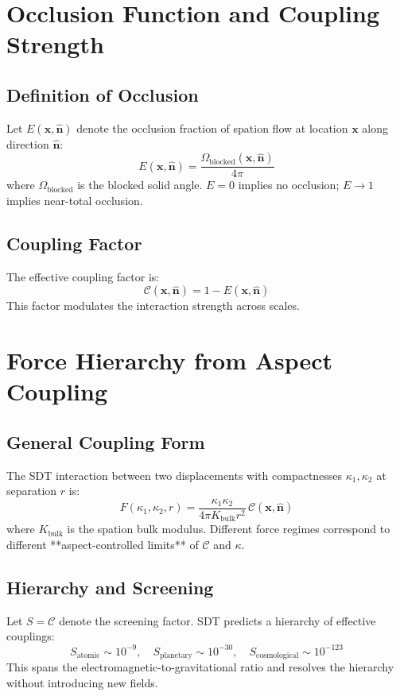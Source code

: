 \section{Occlusion Function and Coupling Strength}

\subsection{Definition of Occlusion}
Let $E(\mathbf{x}, \hat{\mathbf{n}})$ denote the occlusion fraction of spation flow at location $\mathbf{x}$ along direction $\hat{\mathbf{n}}$:
\begin{equation}
E(\mathbf{x}, \hat{\mathbf{n}}) = \frac{\Omega_{\text{blocked}}(\mathbf{x}, \hat{\mathbf{n}})}{4\pi}
\end{equation}
where $\Omega_{\text{blocked}}$ is the blocked solid angle. $E=0$ implies no occlusion; $E \to 1$ implies near-total occlusion.

\subsection{Coupling Factor}
The effective coupling factor is:
\begin{equation}
\mathcal{C}(\mathbf{x}, \hat{\mathbf{n}}) = 1 - E(\mathbf{x}, \hat{\mathbf{n}})
\end{equation}
This factor modulates the interaction strength across scales.

\section{Force Hierarchy from Aspect Coupling}

\subsection{General Coupling Form}
The SDT interaction between two displacements with compactnesses $\kappa_1, \kappa_2$ at separation $r$ is:
\begin{equation}
F(\kappa_1, \kappa_2, r) = \frac{\kappa_1 \kappa_2}{4\pi K_{\text{bulk}} r^2}\,\mathcal{C}(\mathbf{x}, \hat{\mathbf{n}})
\end{equation}
where $K_{\text{bulk}}$ is the spation bulk modulus. Different force regimes correspond to different **aspect-controlled limits** of $\mathcal{C}$ and $\kappa$.

\subsection{Hierarchy and Screening}
Let $S = \mathcal{C}$ denote the screening factor. SDT predicts a hierarchy of effective couplings:
\begin{equation}
S_{\text{atomic}} \sim 10^{-9}, \quad S_{\text{planetary}} \sim 10^{-30}, \quad S_{\text{cosmological}} \sim 10^{-123}
\end{equation}
This spans the electromagnetic-to-gravitational ratio and resolves the hierarchy without introducing new fields.

